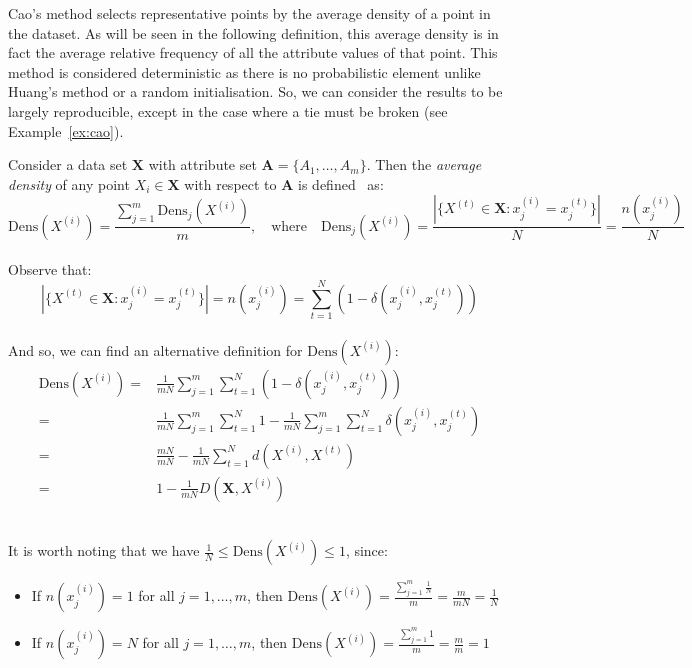 Cao's method selects representative points by the average density of a point in
the dataset. As will be seen in the following definition, this average density 
is in fact the average relative frequency of all the attribute values of that 
point. This method is considered deterministic as there is no probabilistic 
element \- unlike Huang's method or a random initialisation. So, we can consider
the results to be largely reproducible, except in the case where a tie must be
broken (see Example~\ref{ex:cao}).\\

\begin{definition}\label{def:density}	
    Consider a data set \(\textbf{X}\) with attribute set \(\textbf{A} = 
    \{A_1, \ldots, A_m\}\). Then the \emph{average density} of any point 
    \(X_i \in \textbf{X}\) with respect to \(\textbf{A}\) is 
    defined~\cite{Cao09} as:
	\[
	    \text{Dens}(X^{(i)}) = \frac{\sum_{j=1}^m \text{Dens}_{j}(X^{(i)})}{m}, 
        \quad \text{where} \quad \text{Dens}_{j}(X^{(i)}) = \frac{|\{X^{(t)} \in 
        \textbf{X} : x_j^{(i)} = x_j^{(t)}\}|}{N} = \frac{n(x_j^{(i)})}{N}
	\]\\

    Observe that:
    \[
	    |\{X^{(t)} \in \textbf{X} : x_j^{(i)} = x_j^{(t)}\}| = n(x_j^{(i)}) = 
	    \sum_{t=1}^N (1 - \delta(x_j^{(i)}, x_j^{(t)}))
    \]\\

    And so, we can find an alternative definition for \(\text{Dens}(X^{(i)})\):
    \begin{equation}\label{eq:alt-def}
    \begin{aligned}
        \text{Dens}(X^{(i)}) = {} & {} \frac{1}{mN} \sum_{j=1}^m \sum_{t=1}^N (1
        - \delta(x_j^{(i)}, x_j^{(t)}))
        \\
        = {} & {} \frac{1}{mN} \sum_{j=1}^m \sum_{t=1}^N 1 - \frac{1}{mN}
        \sum_{j=1}^m \sum_{t=1}^N \delta(x_j^{(i)}, x_j^{(t)})
        \\
        = {} & {} \frac{mN}{mN} - \frac{1}{mN} \sum_{t=1}^N d(X^{(i)}, X^{(t)})
        \\
        = {} & {} 1 - \frac{1}{mN} D(\textbf{X}, X^{(i)})
    \end{aligned}
    \end{equation}\\
\end{definition}

\begin{remark}
    It is worth noting that we have \(\frac{1}{N} \leq \text{Dens}(X^{(i)})
    \leq 1\), since:		
	\begin{itemize}	
        \item If \(n(x_j^{(i)}) = 1\) for all \(j = 1, \ldots, m\), then
            \(\text{Dens}(X^{(i)}) = \frac{\sum_{j=1}^m \frac{1}{N}}{m} =
            \frac{m}{mN} = \frac{1}{N}\)
        \item If \(n(x_j^{(i)}) = N\) for all \(j = 1, \ldots, m\), then
            \(\text{Dens}(X^{(i)}) = \frac{\sum_{j=1}^m 1}{m} = \frac{m}{m} =
            1\)\\
	\end{itemize}
\end{remark}

